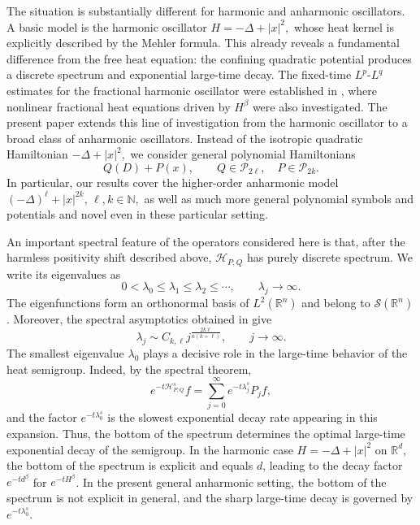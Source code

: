 \documentclass[12pt, reqno]{amsart}
\theoremstyle{definition}
\theoremstyle{remark}
\numberwithin{equation}{section}
\newcommand{\Rn}{{\mathbb{R}}^{n}}
\begin{document}
The situation is substantially different for harmonic and anharmonic oscillators. A basic model is the harmonic oscillator $H=-\Delta+|x|^2,$
whose heat kernel is explicitly described by the Mehler formula. This already reveals a fundamental difference from the free heat equation: the confining quadratic potential produces a discrete spectrum and exponential large-time decay. The fixed-time $L^p$-$L^q$ estimates for the fractional harmonic oscillator were established in \cite{than:hs1}, where nonlinear fractional heat equations driven by $H^\beta$ were also investigated. The present paper extends this line of investigation from the harmonic oscillator to a broad class of anharmonic oscillators. Instead of the isotropic quadratic Hamiltonian
$-\Delta+|x|^2,$ we consider general polynomial Hamiltonians
\[
Q(D)+P(x),
\qquad
Q\in\mathcal P_{2\ell},\quad P\in\mathcal P_{2k}.
\]
In particular, our results cover the higher-order anharmonic model $(-\Delta)^\ell+|x|^{2k},
\,
\ell,k\in\mathbb N,$
as well as much more general polynomial symbols and potentials and novel even in these particular setting. %

An important spectral feature of the operators considered here is that, after the harmless positivity shift described above, $\mathcal{H}_{P,Q}$ has purely discrete spectrum. We write its eigenvalues as
\[
0<\lambda_0\leq \lambda_1\leq \lambda_2\leq \cdots,
\qquad
\lambda_j\rightarrow\infty.
\]
The eigenfunctions form an orthonormal basis of $L^2(\Rn)$ and belong to $\mathcal{S}(\Rn)$. Moreover, the spectral asymptotics obtained in \cite{anh:cdr} give
\[
\lambda_j\sim C_{k,\ell}j^{\frac{2k\ell}{n(k+\ell)}},
\qquad
j\rightarrow\infty.
\]
The smallest eigenvalue $\lambda_0$ plays a decisive role in the large-time behavior of the heat semigroup. Indeed, by the spectral theorem,
\[
e^{-t\mathcal{H}_{P,Q}^s}f
=
\sum_{j=0}^{\infty}
e^{-t\lambda_j^s}P_jf,
\]
and the factor $e^{-t\lambda_0^s}$ is the slowest exponential decay rate appearing in this expansion. Thus, the bottom of the spectrum determines the optimal large-time exponential decay of the semigroup. In the harmonic case $H=-\Delta+|x|^2$ on $\mathbb R^d$, the bottom of the spectrum is explicit and equals $d$, leading to the decay factor $e^{-td^\beta}$ for $e^{-tH^\beta}$. In the present general anharmonic setting, the bottom of the spectrum is not explicit in general, and the sharp large-time decay is governed by $e^{-t\lambda_0^s}$.\\
\end{document}
